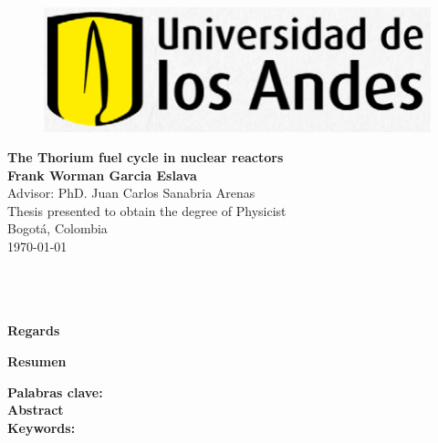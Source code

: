 
\begin{center}
\begin{figure}
    \centering%
    \includegraphics[scale=0.6]{HojaTitulo/Figures_HojaTitulo/Escudo_Uniandes} %
\end{figure}
\thispagestyle{empty} \vspace*{2.0cm} \textbf{\LARGE
The Thorium fuel cycle in nuclear reactors}\\[2.5cm]

\Large\textbf{Frank Worman Garcia Eslava}\\[2.0cm]

Advisor: PhD. Juan Carlos Sanabria Arenas \\[2.0cm]


\Large Thesis presented to obtain the degree of Physicist \\ [2.0cm]


Bogot\'{a}, Colombia\\ [0.5cm]
\today \\
\end{center}

\newpage{\pagestyle{empty}\cleardoublepage}

\newpage
\thispagestyle{empty} \textbf{}\normalsize
\\\\\\%
\textbf{\LARGE Regards}\\



\newpage{\pagestyle{empty}\cleardoublepage}

\textbf{\LARGE Resumen}


\textbf{\small Palabras clave: }\\


\newpage
\textbf{\LARGE Abstract}\\


\textbf{\small Keywords:}\\